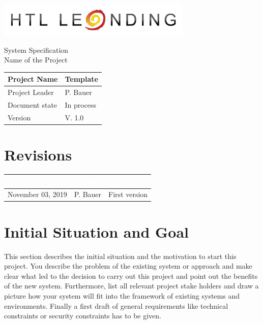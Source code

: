 \documentclass[12pt]{article}
\theoremstyle{definition}
\newenvironment{explanation}{%
   \setlength{\parindent}{0pt}
   \itshape
   \color{blue}
}{}
\newcommand{\projectname}{Template}
\newcommand{\productname}{Name of the Project}
\newcommand{\projectleader}{P. Bauer}
\newcommand{\documentstatus}{In process}
\newcommand{\version}{V. 1.0}
\begin{document}
\begin{titlepage}
\begin{flushright}
\includegraphics[scale=.5]{htlleondinglogo.png}\\
\end{flushright}

\vspace{10em}

\begin{center}
{\Huge System Specification} \\[3em]
{\LARGE \productname} \\[3em]
\end{center}

\begin{flushleft}
\begin{tabular}{|l|l|}
\hline
Project Name & \projectname \\ \hline
Project Leader & \projectleader \\ \hline
Document state & \documentstatus \\ \hline
Version & \version \\ \hline
\end{tabular}
\end{flushleft}

\end{titlepage}
\section*{Revisions}
\begin{tabular}{|l|l|l|}
\hline
\cellcolor[gray]{0.5}\textcolor{white}{Date} & \cellcolor[gray]{0.5}\textcolor{white}{Author} & \cellcolor[gray]{0.5}\textcolor{white}{Change} \\ \hline
November 03, 2019&P. Bauer&First version \\ \hline
\end{tabular}
\pagebreak

\tableofcontents
\pagebreak

\section{Initial Situation and Goal}
\begin{explanation}
This section describes the initial situation and the motivation to start this project. You describe the problem of the existing system or approach and make clear what led to the decision to carry out this project and point out the benefits of the new system.
Furthermore, list all relevant project stake holders and draw a picture how your system will fit into the framework of existing systems and environments. Finally a first draft of general requirements like technical constraints or security constraints has to be given.
\end{explanation}
\end{document}
